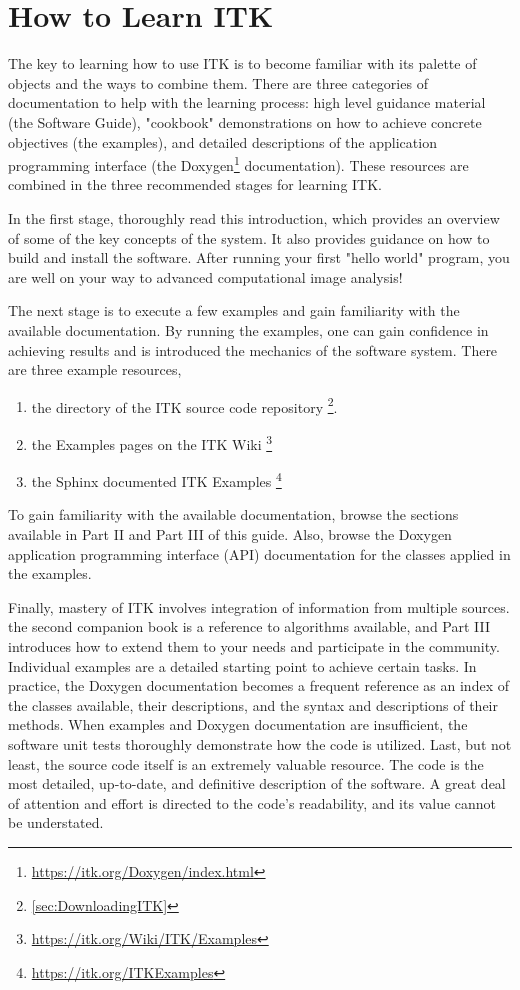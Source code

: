 \section{How to Learn ITK}
\label{sec:HowToLearnITK}

The key to learning how to use ITK is to become familiar with its palette of
objects and the ways to combine them. There are three categories of
documentation to help with the learning process: high level guidance material
(the Software Guide), "cookbook" demonstrations on how to achieve concrete
objectives (the examples), and detailed descriptions of the
application programming interface (the
Doxygen\footnote{\url{https://itk.org/Doxygen/index.html}} documentation). These
resources are combined in the three recommended stages for learning ITK.

In the first stage, thoroughly read this introduction, which provides an
overview of some of the key concepts of the system. It also provides guidance
on how to build and install the software. After running your first "hello
world" program, you are well on your way to advanced computational image
analysis!

The next stage is to execute a few examples and gain familiarity with the
available documentation. By running the examples, one can gain confidence
in achieving results and is introduced the mechanics of the software system.
There are three example resources,
\begin{enumerate}
  \item	the  directory of the ITK source code repository \footnote{\ref{sec:DownloadingITK}}.
  \item the Examples pages on the ITK Wiki \footnote{\url{https://itk.org/Wiki/ITK/Examples}}
  \item	the Sphinx documented ITK Examples \footnote{\url{https://itk.org/ITKExamples}}
\end{enumerate}
To gain familiarity with the available documentation, browse the sections
available in Part II and Part III of this guide. Also, browse the Doxygen
application programming interface (API) documentation for the classes applied
in the examples.

Finally, mastery of ITK involves integration of information from multiple
sources. the second companion book is a reference to algorithms available, and
Part III introduces how to extend them to your needs and participate in the
community. Individual examples are a detailed starting point to achieve
certain tasks.  In practice, the Doxygen documentation becomes a frequent
reference as an index of the classes available, their descriptions, and the
syntax and descriptions of their methods. When examples and Doxygen
documentation are insufficient, the software unit tests thoroughly demonstrate
how the code is utilized. Last, but not least, the source code itself
is an extremely valuable resource. The code is the most detailed, up-to-date, and
definitive description of the software. A great deal of attention and effort
is directed to the code's readability, and its value cannot be understated.

